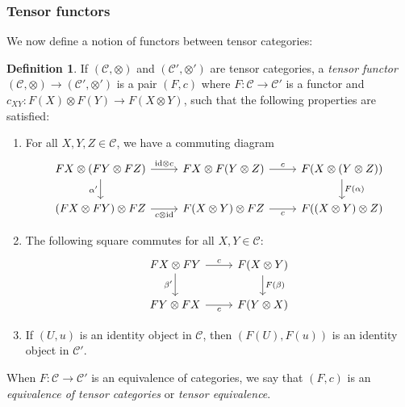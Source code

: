 \documentclass[10pt]{amsart}
\numberwithin{equation}{section}
\def\~#1{\mathscr{#1}}
\newcommand{\id}{\mathrm{id}}
\theoremstyle{plain}
\theoremstyle{definition}
\newtheorem{defn}[thm]{Definition}
\theoremstyle{remark}
\begin{document}
\subsubsection{Tensor functors} We now define a notion of functors between tensor categories:
\begin{defn}
    If $(\~C, \otimes)$ and $(\~C', \otimes')$ are tensor categories, a \emph{tensor functor} $(\~C, \otimes) \to (\~C', \otimes')$ is a pair $(F, c)$ where $F: \~C \to \~C'$ is a functor and $c_{XY}: F(X) \otimes F(Y) \to F(X \otimes Y)$, such that the following properties are satisfied:
    \begin{enumerate}
        \item For all $X, Y, Z \in \~C$, we have a commuting diagram
        \[\begin{tikzcd}
    {FX \otimes (FY \otimes FZ)} & {FX \otimes F(Y \otimes Z)} & {F(X \otimes(Y \otimes Z))} \\
    {(FX \otimes FY) \otimes FZ} & {F(X\otimes Y) \otimes FZ} & {F((X \otimes Y) \otimes Z)}
    \arrow["{\id \otimes c}", from=1-1, to=1-2]
    \arrow["{\alpha'}"', from=1-1, to=2-1]
    \arrow["c", from=1-2, to=1-3]
    \arrow["{F(\alpha)}", from=1-3, to=2-3]
    \arrow["{c \otimes \id}"', from=2-1, to=2-2]
    \arrow["c"', from=2-2, to=2-3]
\end{tikzcd}\]
\item The following square commutes for all $X, Y \in \~C$:
\[\begin{tikzcd}
    {FX \otimes FY} & {F(X\otimes Y)} \\
    {FY \otimes FX} & {F(Y \otimes X)}
    \arrow["c", from=1-1, to=1-2]
    \arrow["{\beta'}"', from=1-1, to=2-1]
    \arrow["{F(\beta)}", from=1-2, to=2-2]
    \arrow["c"', from=2-1, to=2-2]
\end{tikzcd}\]
\item If $(U, u)$ is an identity object in $\~C$, then $(F(U), F(u))$ is an identity object in $\~C'$.
    \end{enumerate}
When $F: \~C \to \~C'$ is an equivalence of categories, we say that $(F, c)$ is an \emph{equivalence of tensor categories} or \emph{tensor equivalence}.
\end{defn}
\end{document}
